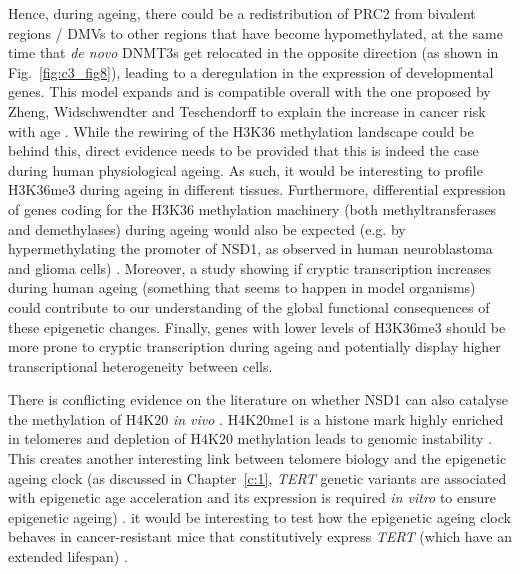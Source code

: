Hence, during ageing, there could be a  redistribution of \acrshort{PRC2} from bivalent regions / \acrshort{DMV}s to other regions that have become hypomethylated, at the same time that \textit{de novo} DNMT3s get relocated in the opposite direction (as shown in Fig.~\ref{fig:c3_fig8}), leading to a deregulation in the expression of developmental genes. This model expands and is compatible overall with the one proposed by Zheng, Widschwendter and Teschendorff to explain the increase in cancer risk with age \cite{Zheng2016}. While the rewiring of the H3K36 methylation landscape could be behind this, direct evidence needs to be provided that this is indeed the case during human physiological ageing. As such, it would be interesting to profile H3K36me3 during ageing in different tissues. Furthermore, differential expression of genes coding for the H3K36 methylation machinery (both methyltransferases and demethylases) during ageing would also be expected (e.g. by hypermethylating the promoter of NSD1, as observed in human neuroblastoma and glioma cells) \cite{Berdasco2009}. Moreover, a study showing if cryptic transcription increases during human ageing (something that seems to happen in model organisms) could contribute to our understanding of the global functional consequences of these epigenetic changes. Finally, genes with lower levels of H3K36me3 should be more prone to cryptic transcription during ageing \cite{Pu2015} and potentially display higher transcriptional heterogeneity between cells. 

\bigskip

There is conflicting evidence on the literature on whether NSD1 can also catalyse the methylation of H4K20 \textit{in vivo} \cite{Berdasco2009,Kudithipudi2014}. H4K20me1 is a histone mark highly enriched in telomeres \cite{Enguix2018} and depletion of H4K20 methylation leads to genomic instability \cite{Sorensen2013}. This creates another interesting link between telomere biology and the epigenetic ageing clock (as discussed in Chapter~\ref{c:1}, \textit{TERT} genetic variants are associated with epigenetic age acceleration and its expression is required \textit{in vitro} to ensure epigenetic ageing) \cite{Lu2018}. it would be interesting to test how the epigenetic ageing clock behaves in cancer-resistant mice that constitutively express \textit{TERT} (which have an extended lifespan) \cite{Tomas-Loba2008}. 

\bigskip

